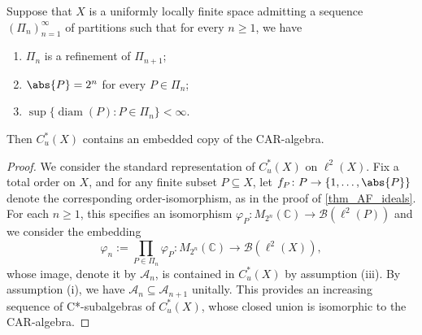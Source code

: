 \documentclass[12pt, a4paper, oneside]{amsart}
\newcommand{\0}{\mathbf{0}}
\newcommand{\1}{\mathbf{1}}
\newcommand{\C}{\mathbb{C}}   %
\newcommand{\A}{\mathscr{A}}
\newcommand{\B}{\mathscr{B}}
\begin{document}
	\begin{proposition}
		\label{prop_CAR}
		Suppose that \(X\) is a uniformly locally finite space admitting a sequence \((\Pi_n)_{n=1}^\infty\) of partitions such that for every \(n \geq 1\), we have 
		\begin{enumerate}
			\item \(\Pi_{n}\) is a refinement of \(\Pi_{n+1}\); 
			\item \(\abs{P} = 2^n\) for every \(P \in \Pi_n\); 
			\item \(\sup \{ \operatorname{diam}(P) : P \in \Pi_n\}< \infty\).  
		\end{enumerate}
		Then \(C_u^*(X)\) contains an embedded copy of the CAR-algebra. 
	\end{proposition}
	
	\begin{proof}
		We consider the standard representation of \(C_u^*(X)\) on \(\ell^2(X)\). Fix a total order on \(X\), and for any finite subset \(P \subseteq X\), let \(f_P \colon P \to \{1, \ldots, \abs{P}\}\) denote the corresponding order-isomorphism, as in the proof of \cref{thm_AF_ideals}. For each \(n \geq 1\), this specifies an isomorphism \(\varphi_P \colon M_{2^n}(\C) \to \B(\ell^2(P))\) and we consider the embedding \[\varphi_n := \prod_{P \in \Pi_n} \varphi_P \colon M_{2^n}(\C) \to \B(\ell^2(X)),\]
		whose image, denote it by \(\A_n\), is contained in \(C_u^*(X)\) by assumption (iii). By assumption (i), we have \(\A_n \subseteq \A_{n+1}\) unitally. This provides an increasing sequence of C*-subalgebras of \(C_u^*(X)\), whose closed union is isomorphic to the CAR-algebra. 
	\end{proof}
	
\end{document}

